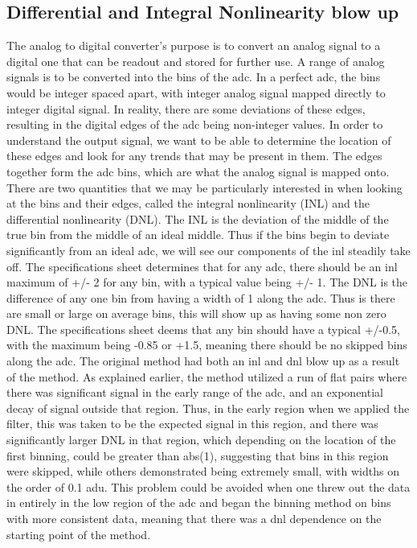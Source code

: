\documentclass[11pt, letterpaper]{article}
\begin{document}
\subsection{Differential and Integral Nonlinearity blow up}
The analog to digital converter’s purpose is to convert an analog signal to a digital one that can be readout and stored for further use. A range of analog signals is to be converted into the bins of the adc. In a perfect adc, the bins would be integer spaced apart, with integer analog signal mapped directly to integer digital signal. In reality, there are some deviations of these edges, resulting in the digital edges of the adc being non-integer values. In order to understand the output signal, we want to be able to determine the location of these edges and look for any trends that may be present in them. The edges together form the adc bins, which are what the analog signal is mapped onto. There are two quantities that we may be particularly interested in when looking at the bins and their edges, called the integral nonlinearity (INL) and the differential nonlinearity (DNL). 
The INL is the deviation of the middle of the true bin from the middle of an ideal middle. Thus if the bins begin to deviate significantly from an ideal adc, we will see our components of the inl steadily take off. The specifications sheet determines that for any adc, there should be an inl maximum of +/- 2 for any bin, with a typical value being +/- 1. 
The DNL is the difference of any one bin from having a width of 1 along the adc. Thus is there are small or large on average bins, this will show up as having some non zero DNL. The specifications sheet deems that any bin should have a typical +/-0.5, with the maximum being -0.85 or +1.5, meaning there should be no skipped bins along the adc. 
The original method had both an inl and dnl blow up as a result of the method. As explained earlier, the method utilized a run of flat pairs where there was significant signal in the early range of the adc, and an exponential decay of signal outside that region. Thus, in the early region when we applied the filter, this was taken to be the expected signal in this region, and there was significantly larger DNL in that region, which depending on the location of the first binning, could be greater than abs(1), suggesting that bins in this region were skipped, while others demonstrated being extremely small, with widths on the order of 0.1 adu. This problem could be avoided when one threw out the data in entirely in the low region of the adc and began the binning method on bins with more consistent data, meaning that there was a dnl dependence on the starting point of the method. 
\end{document}
